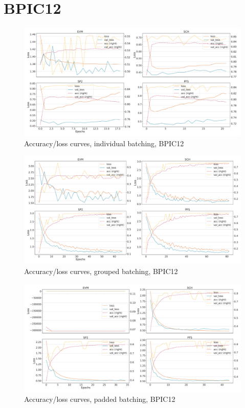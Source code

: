 \section*{BPIC12}
\begin{figure}[!htb]
    \centering
    \includegraphics[width=\textwidth]{gfx/bpic2012/individual_loss_acc_curve.pdf}
    \caption{Accuracy/loss curves, individual batching, BPIC12}
\end{figure}
\begin{figure}[!htb]
    \centering
    \includegraphics[width=\textwidth]{gfx/bpic2012/grouped_loss_acc_curve.pdf}
    \caption{Accuracy/loss curves, grouped batching, BPIC12}
\end{figure}
\begin{figure}[!htb]
    \centering
    \includegraphics[width=\textwidth]{gfx/bpic2012/padded_loss_acc_curve.pdf}
    \caption{Accuracy/loss curves, padded batching, BPIC12}
\end{figure}
